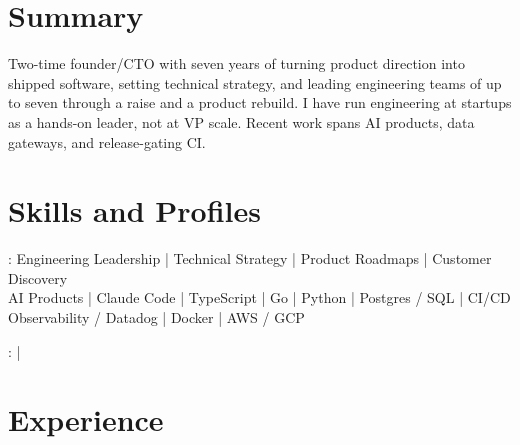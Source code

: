 \documentclass[print]{jack-resume}
\begin{document}
\pagecolor{darkmodeBackground}


\begin{minipage}[t][1cm][t]{.03\textwidth}
    \hfill
\end{minipage}

\section{Summary}
Two-time founder/CTO with seven years of turning product direction into shipped software, setting technical strategy, and leading engineering teams of up to seven through a raise and a product rebuild. I have run engineering at startups as a hands-on leader, not at VP scale. Recent work spans AI products, data gateways, and release-gating CI.
\sectionsep

\section{Skills and Profiles}
:
Engineering Leadership \hfill | \hfill
Technical Strategy \hfill | \hfill
Product Roadmaps \hfill | \hfill
Customer Discovery \\
\hspace{1.0cm} AI Products \hfill | \hfill
Claude Code \hfill | \hfill
TypeScript \hfill | \hfill
Go \hfill | \hfill
Python \hfill | \hfill
Postgres / SQL \hfill | \hfill
CI/CD \\
\hspace{1.0cm} Observability / Datadog \hfill | \hfill
Docker \hfill | \hfill
AWS / GCP \\

\raggedright{
    :
      \href{https://www.linkedin.com/in/jack-sturtevant/}{ \ExternalLink} |
     \href{https://github.com/jacksturt}{ \ExternalLink}}

\section{Experience}
\end{document}

